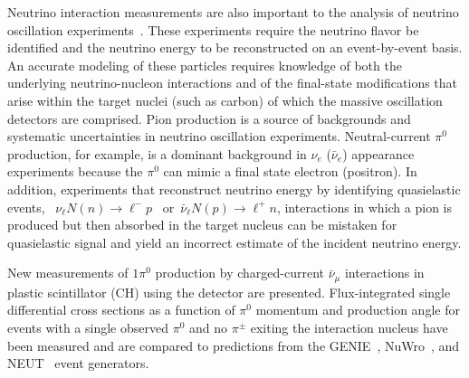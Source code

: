 Neutrino interaction measurements are also important to the analysis of neutrino
oscillation experiments~\cite{Abe:2011ks,Ayres:2004js,AguilarArevalo:2010wv,LBNE}. 
These experiments require the neutrino flavor be
identified and the neutrino energy to be reconstructed on an event-by-event basis.
An accurate modeling of these particles requires knowledge of both the underlying
neutrino-nucleon interactions and of the final-state modifications that arise within the
target nuclei (such as carbon) of which the massive oscillation detectors are comprised.
Pion production is a source of backgrounds and systematic uncertainties in neutrino oscillation experiments. 
Neutral-current $\pi^0$ production, for example, is a dominant background in
$\nu_e$ ($\bar{\nu}_e$) appearance experiments because the $\pi^0$ can mimic 
a final state electron (positron).
In addition, experiments that reconstruct neutrino energy by 
identifying quasielastic events,
~$\nu_\ell N(n) \rightarrow \ell^{-} p$~
or~$\bar{\nu}_\ell N(p) \rightarrow \ell^{+} n$, 
interactions in which a pion is produced but then absorbed in the target 
nucleus can be mistaken for quasielastic signal and yield an incorrect estimate of the 
incident neutrino energy.

New measurements of $1\pi^0$ production by 
charged-current $\bar{\nu}_\mu$ interactions in plastic scintillator (CH) using
the \minerva detector are presented.
Flux-integrated single differential cross sections as a function of $\pi^0$ momentum and production angle for events with a
single observed $\pi^0$ and no $\pi^\pm$ exiting the interaction nucleus have
been measured and are compared to
predictions from the GENIE~\cite{Andreopoulos201087}, NuWro~\cite{Juszczak:2005zs,Golan:2012rfa}, 
and NEUT~\cite{Hayato:2009zz} event generators.
